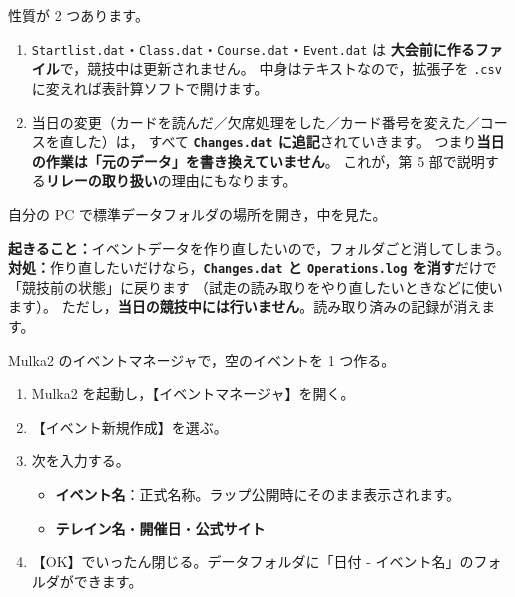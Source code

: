 性質が 2 つあります。

\begin{enumerate}
\item \texttt{Startlist.dat}・\texttt{Class.dat}・\texttt{Course.dat}・\texttt{Event.dat} は
      \textbf{大会前に作るファイル}で，競技中は更新されません。
      中身はテキストなので，拡張子を \texttt{.csv} に変えれば表計算ソフトで開けます。
\item 当日の変更（カードを読んだ／欠席処理をした／カード番号を変えた／コースを直した）は，
      すべて \textbf{\texttt{Changes.dat} に追記}されていきます。
      つまり\textbf{当日の作業は「元のデータ」を書き換えていません}。
      これが，第 5 部で説明する\textbf{リレーの取り扱い}の理由にもなります。
\end{enumerate}

\begin{Done}
自分の PC で標準データフォルダの場所を開き，中を見た。
\end{Done}

\begin{Fail}
\textbf{起きること：}イベントデータを作り直したいので，フォルダごと消してしまう。\\
\textbf{対処：}作り直したいだけなら，\textbf{\texttt{Changes.dat} と
\texttt{Operations.log} を消す}だけで「競技前の状態」に戻ります
（試走の読み取りをやり直したいときなどに使います）。
ただし，\textbf{当日の競技中には行いません}。読み取り済みの記録が消えます。
\end{Fail}


\begin{Goal}
Mulka2 のイベントマネージャで，空のイベントを 1 つ作る。
\end{Goal}

\begin{enumerate}
\item Mulka2 を起動し，【イベントマネージャ】を開く。
\item 【イベント新規作成】を選ぶ。
\item 次を入力する。\ver
  \begin{itemize}
  \item \textbf{イベント名}：正式名称。ラップ公開時にそのまま表示されます。
  \item \textbf{テレイン名}・\textbf{開催日}・\textbf{公式サイト}
  \end{itemize}
\item 【OK】でいったん閉じる。データフォルダに「日付 - イベント名」のフォルダができます。
\end{enumerate}

